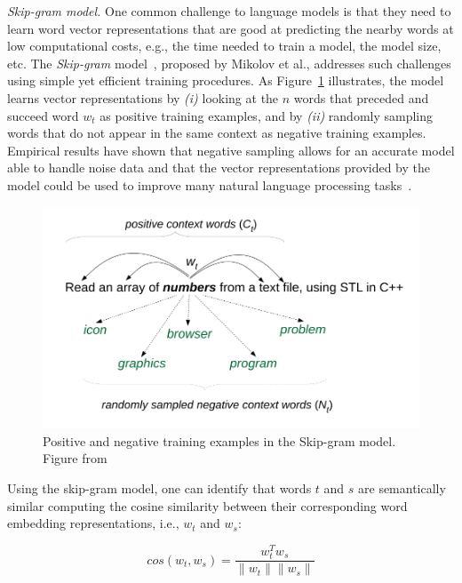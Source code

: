 \smallskip
\begin{hangparas}{.0in}{0}
     \textit{ Skip-gram model.} One common challenge to language models is that they need to learn word vector representations that are good at predicting the nearby words at low computational costs, e.g., the time needed to train a model, the model size, etc.
    The \textit{Skip-gram} model~\cite{Mikolov2013}, proposed by Mikolov et al., addresses such challenges using simple yet efficient training procedures. As Figure~\ref{fig:skip-gram-example} illustrates, the model learns vector representations by \textit{(i)} looking at the $n$ words that preceded and succeed word $w_t$
     as positive training examples, and by \textit{(ii)} randomly sampling words that do not appear in the same context as negative training examples. Empirical results have shown that negative sampling allows for an accurate model able to handle noise data and that 
     the vector representations provided by the model could be used to improve many natural language processing tasks~\cite{mikolov2013efficient}.
\end{hangparas}



\begin{figure}[H]
    \centering
    \includegraphics[width=.65\linewidth]{fig/cp5/ye-skip-gram-example}
    \caption{Positive and negative training examples in the Skip-gram model. Figure from~\cite{Ye2016}}
    \label{fig:skip-gram-example}
\end{figure}



Using the skip-gram model, one can identify that words $t$ and $s$ are semantically similar 
computing the cosine similarity between their corresponding word embedding representations, i.e., $w_t$ and $w_s$:



\begin{equation}
    cos(w_t,w_s) = \frac{w_t^Tw_s}{\|w_t\| \|w_s\|}
    \label{eq:word-sim}
\end{equation}






